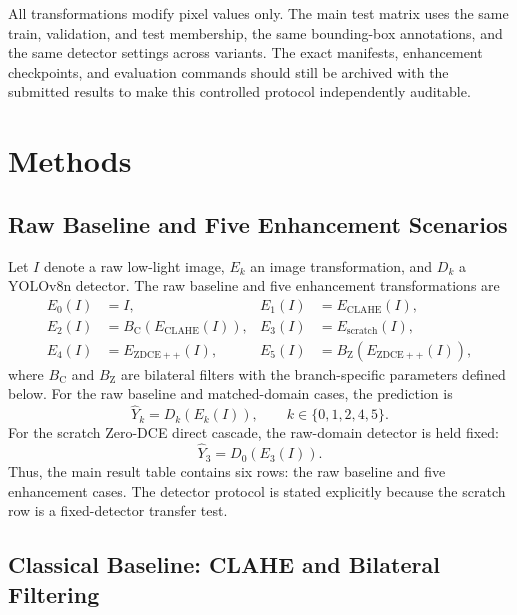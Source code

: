 \documentclass[11pt,a4paper]{article}
\begin{document}
All transformations modify pixel values only. The main test matrix uses the
same train, validation, and test membership, the same bounding-box annotations,
and the same detector settings across variants. The exact manifests,
enhancement checkpoints, and evaluation commands should still be archived with
the submitted results to make this controlled protocol independently auditable.

\section{Methods}

\subsection{Raw Baseline and Five Enhancement Scenarios}

Let \(I\) denote a raw low-light image, \(E_k\) an image transformation, and
\(D_k\) a YOLOv8n detector. The
raw baseline and five enhancement transformations are
\begin{align}
E_0(I) &= I, &
E_1(I) &= E_{\mathrm{CLAHE}}(I), \nonumber\\
E_2(I) &= B_{\mathrm{C}}\!\left(E_{\mathrm{CLAHE}}(I)\right), &
E_3(I) &= E_{\mathrm{scratch}}(I), \nonumber\\
E_4(I) &= E_{\mathrm{ZDCE++}}(I), &
E_5(I) &= B_{\mathrm{Z}}\!\left(E_{\mathrm{ZDCE++}}(I)\right),
\end{align}
where \(B_{\mathrm{C}}\) and \(B_{\mathrm{Z}}\) are bilateral filters with the
branch-specific parameters defined below.
For the raw baseline and matched-domain cases, the prediction is
\begin{equation}
    \hat{Y}_{k}=D_k(E_k(I)), \qquad k\in\{0,1,2,4,5\}.
\end{equation}
For the scratch Zero-DCE direct cascade, the raw-domain detector is held fixed:
\begin{equation}
    \hat{Y}_{3}=D_0(E_3(I)).
\end{equation}
Thus, the main result table contains six rows: the raw baseline and five
enhancement cases. The detector protocol is stated explicitly because the
scratch row is a fixed-detector transfer test.

\subsection{Classical Baseline: CLAHE and Bilateral Filtering}
\end{document}
